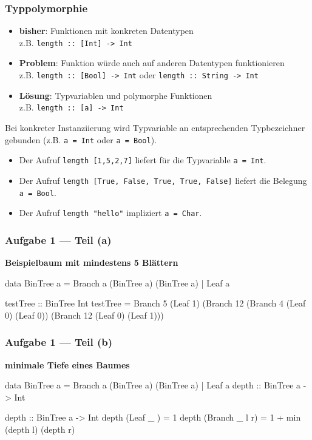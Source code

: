 \documentclass{beamer}
\begin{document}
\begin{frame}[fragile, t] \frametitle{Typpolymorphie}
	\footnotesize
	\begin{itemize}
		\item \textbf{bisher}: Funktionen mit konkreten Datentypen \\
		z.B. \texttt{length :: [Int] -> Int}
		\item \textbf{Problem}: Funktion würde auch auf anderen Datentypen funktionieren \\
		z.B. \texttt{length :: [Bool] -> Int} oder \texttt{length :: String -> Int}
		\item \textbf{Lösung}: Typvariablen und polymorphe Funktionen \\
		z.B. \texttt{length :: [\alert{a}] -> Int}
	\end{itemize}
	
	\pause
	
	Bei konkreter Instanziierung wird Typvariable an entsprechenden Typbezeichner gebunden (z.B. \texttt{\alert{a} = Int} oder \texttt{\alert{a} = Bool}).
	
	\begin{itemize}
		\item Der Aufruf \texttt{length [1,5,2,7]} liefert für die Typvariable \texttt{\alert{a} = Int}.
		\item Der Aufruf \texttt{length [True, False, True, True, False]} liefert die Belegung \texttt{\alert{a} = Bool}.
		\item Der Aufruf \texttt{length "hello"} impliziert \texttt{\alert{a} = Char}.
	\end{itemize}
\end{frame}


\begin{frame}[fragile, t] \frametitle{Aufgabe 1 --- Teil (a)}
	\textbf{Beispielbaum mit mindestens 5 Blättern} \\[6pt]
	\begin{codebox}
data BinTree a = Branch a (BinTree a) (BinTree a) | Leaf a
	\end{codebox}
	\pause
	\begin{codebox}
testTree :: BinTree Int
testTree = Branch 5
             (Leaf 1)
             (Branch 12
                (Branch 4
                   (Leaf 0)
                   (Leaf 0))
                (Branch 12
                   (Leaf 0)
                   (Leaf 1)))
	\end{codebox}
\end{frame}

\begin{frame}[fragile, t] \frametitle{Aufgabe 1 --- Teil (b)}
	\textbf{minimale Tiefe eines Baumes}
	
	\begin{codebox}
data BinTree a = Branch a (BinTree a) (BinTree a) | Leaf a
depth :: BinTree a -> Int
	\end{codebox}
	
	\bigskip \pause
	
	\begin{codebox}
depth :: BinTree a -> Int
depth (Leaf   _    ) = 1
depth (Branch _ l r) = 1 + min (depth l) (depth r)
	\end{codebox}
\end{frame}
\end{document}
